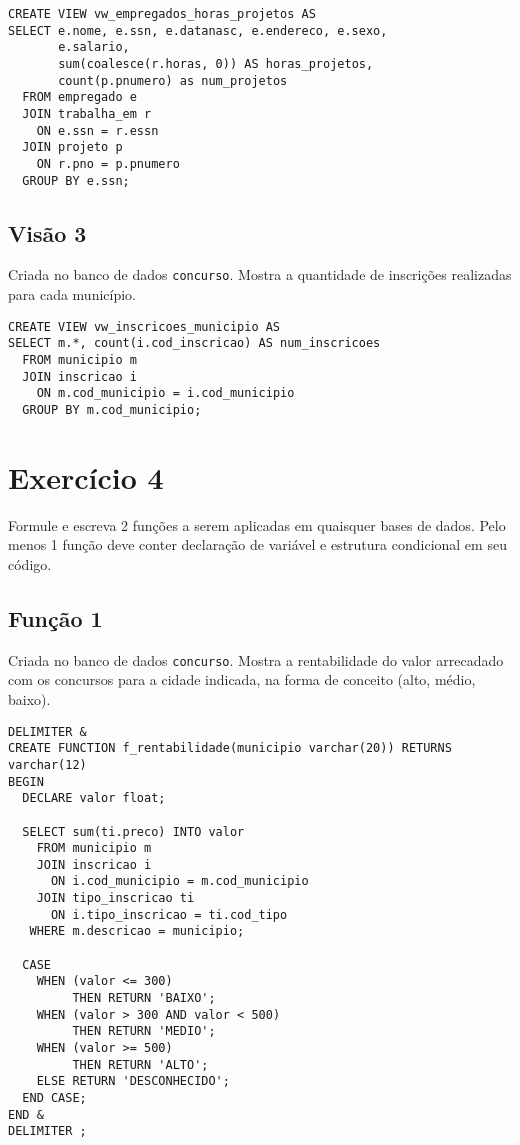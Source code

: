 \documentclass[article, a4paper, oneside, 11pt, english, brazil, sumario=tradicional]{abntex2}
\begin{document}
\begin{verbatim}
CREATE VIEW vw_empregados_horas_projetos AS
SELECT e.nome, e.ssn, e.datanasc, e.endereco, e.sexo,
       e.salario,
       sum(coalesce(r.horas, 0)) AS horas_projetos,
       count(p.pnumero) as num_projetos
  FROM empregado e
  JOIN trabalha_em r
    ON e.ssn = r.essn
  JOIN projeto p
    ON r.pno = p.pnumero
  GROUP BY e.ssn;
\end{verbatim}

\subsection{Visão 3}
\label{sec:orgc2e580e}

Criada no banco de dados \texttt{concurso}.
Mostra a quantidade de inscrições realizadas para cada município.

\begin{verbatim}
CREATE VIEW vw_inscricoes_municipio AS
SELECT m.*, count(i.cod_inscricao) AS num_inscricoes
  FROM municipio m
  JOIN inscricao i
    ON m.cod_municipio = i.cod_municipio
  GROUP BY m.cod_municipio;
\end{verbatim}

\section{Exercício 4}
\label{sec:org47c698a}

Formule e escreva 2 funções a serem  aplicadas em quaisquer bases de dados. Pelo
menos 1 função deve conter declaração de variável e estrutura condicional em seu
código.

\subsection{Função 1}
\label{sec:org2e4efe6}

Criada no banco de dados \texttt{concurso}.
Mostra  a rentabilidade  do  valor arrecadado  com os  concursos  para a  cidade
indicada, na forma de conceito (alto, médio, baixo).

\begin{verbatim}
DELIMITER &
CREATE FUNCTION f_rentabilidade(municipio varchar(20)) RETURNS varchar(12)
BEGIN
  DECLARE valor float;

  SELECT sum(ti.preco) INTO valor
    FROM municipio m
    JOIN inscricao i
      ON i.cod_municipio = m.cod_municipio
    JOIN tipo_inscricao ti
      ON i.tipo_inscricao = ti.cod_tipo
   WHERE m.descricao = municipio;

  CASE
    WHEN (valor <= 300)
         THEN RETURN 'BAIXO';     
    WHEN (valor > 300 AND valor < 500)
         THEN RETURN 'MEDIO';
    WHEN (valor >= 500)
         THEN RETURN 'ALTO';
    ELSE RETURN 'DESCONHECIDO';
  END CASE;
END &
DELIMITER ;
\end{verbatim}
\end{document}
